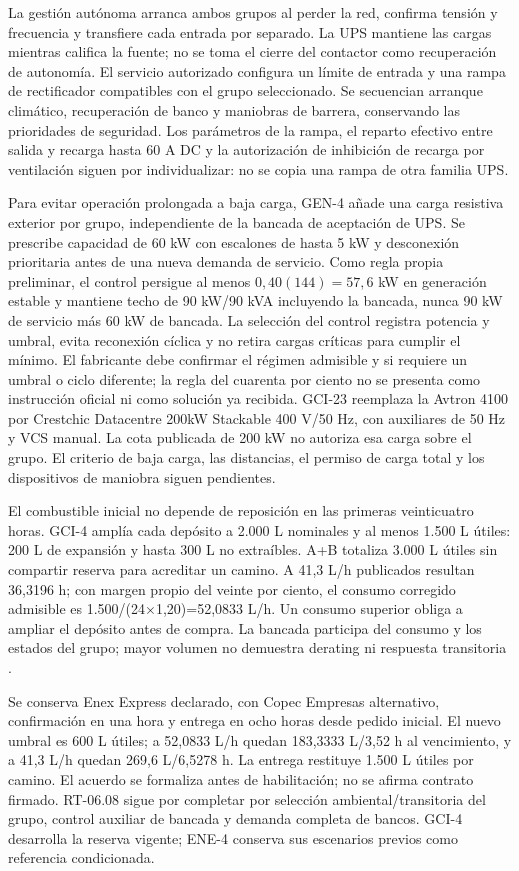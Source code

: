 La gestión autónoma arranca ambos grupos al perder la red, confirma tensión y frecuencia y transfiere cada entrada por separado. La UPS mantiene las cargas mientras califica la fuente; no se toma el cierre del contactor como recuperación de autonomía. El servicio autorizado configura un límite de entrada y una rampa de rectificador compatibles con el grupo seleccionado. Se secuencian arranque climático, recuperación de banco y maniobras de barrera, conservando las prioridades de seguridad. Los parámetros de la rampa, el reparto efectivo entre salida y recarga hasta 60 A DC y la autorización de inhibición de recarga por ventilación siguen por individualizar: no se copia una rampa de otra familia UPS.

Para evitar operación prolongada a baja carga, GEN-4 añade una carga resistiva exterior por grupo, independiente de la bancada de aceptación de UPS. Se prescribe capacidad de 60 kW con escalones de hasta 5 kW y desconexión prioritaria antes de una nueva demanda de servicio. Como regla propia preliminar, el control persigue al menos $0,40(144)=57,6$ kW en generación estable y mantiene techo de 90 kW/90 kVA incluyendo la bancada, nunca 90 kW de servicio más 60 kW de bancada. La selección del control registra potencia y umbral, evita reconexión cíclica y no retira cargas críticas para cumplir el mínimo. El fabricante debe confirmar el régimen admisible y si requiere un umbral o ciclo diferente; la regla del cuarenta por ciento no se presenta como instrucción oficial ni como solución ya recibida. GCI-23 reemplaza la Avtron 4100 por Crestchic Datacentre 200kW Stackable 400 V/50 Hz, con auxiliares de 50 Hz y VCS manual. La cota publicada de 200 kW no autoriza esa carga sobre el grupo. El criterio de baja carga, las distancias, el permiso de carga total y los dispositivos de maniobra siguen pendientes.

El combustible inicial no depende de reposición en las primeras veinticuatro horas. GCI-4 amplía cada depósito a 2.000 L nominales y al menos 1.500 L útiles: 200 L de expansión y hasta 300 L no extraíbles. A+B totaliza 3.000 L útiles sin compartir reserva para acreditar un camino. A 41,3 L/h publicados resultan 36,3196 h; con margen propio del veinte por ciento, el consumo corregido admisible es 1.500/(24$\times$1,20)=52,0833 L/h. Un consumo superior obliga a ampliar el depósito antes de compra. La bancada participa del consumo y los estados del grupo; mayor volumen no demuestra derating ni respuesta transitoria \parencite{p7-fg-p200-ficha}.

Se conserva Enex Express declarado, con Copec Empresas alternativo, confirmación en una hora y entrega en ocho horas desde pedido inicial. El nuevo umbral es 600 L útiles; a 52,0833 L/h quedan 183,3333 L/3,52 h al vencimiento, y a 41,3 L/h quedan 269,6 L/6,5278 h. La entrega restituye 1.500 L útiles por camino. El acuerdo se formaliza antes de habilitación; no se afirma contrato firmado. RT-06.08 sigue por completar por selección ambiental/transitoria del grupo, control auxiliar de bancada y demanda completa de bancos. GCI-4 desarrolla la reserva vigente; ENE-4 conserva sus escenarios previos como referencia condicionada.

